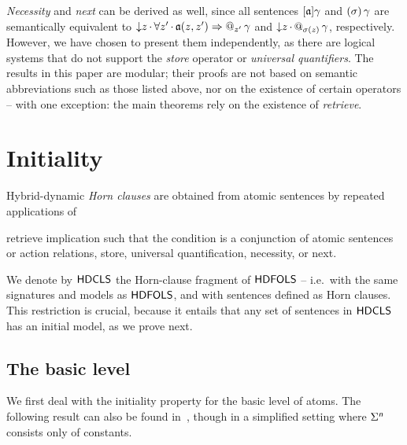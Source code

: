 \documentclass[a4paper,UKenglish,cleveref,autoref]{lipics-v2019}
\begin{document}
\emph{Necessity} and \emph{next} can be derived as well, since all sentences \([\mathfrak{a}] \gamma\) and \((\sigma)\, \gamma\) are semantically equivalent to \({\downarrow}z\,{\cdot}\, \forall z'\,{\cdot}\, \mathfrak{a}(z, z') \Rightarrow @_{z'}\, \gamma\) and \({\downarrow}z\,{\cdot}\, @_{\sigma(z)}\, \gamma\), respectively.
However, we have chosen to present them independently, as there are logical systems that do not support the \emph{store} operator or \emph{universal quantifiers}.
The results in this paper are modular; their proofs are not based on semantic abbreviations such as those listed above, nor on the existence of certain operators -- with one exception: the main theorems rely on the existence of \emph{retrieve}.


\section{Initiality}
\label{section:initiality}

Hybrid-dynamic \emph{Horn clauses} are obtained from atomic sentences by repeated applications of%
\begin{inparenum}
  \inparitem retrieve
  \inparitem implication such that the condition is a conjunction of atomic sentences or action relations, 
  \inparitem store,
  \inparitem universal quantification,
  \inparitem necessity, or
  \inparitem next.
\end{inparenum}
We denote by \({\mathsf{HDCLS}}\) the Horn-clause fragment of \({\mathsf{HDFOLS}}\) -- i.e.\ with the same signatures and models as \({\mathsf{HDFOLS}}\), and with sentences defined as Horn clauses.
This restriction is crucial, because it entails that any set of sentences in \({\mathsf{HDCLS}}\) has an initial model, as we prove next.


\subsection{The basic level}
\label{subsection:basic-level}

We first deal with the initiality property for the basic level of atoms.
The following result can also be found in~\cite{Gaina17Her}, though in a simplified setting where \(\Sigma^{\text{\normalfont\sffamily\itshape n}}\) consists only of constants.
\end{document}
